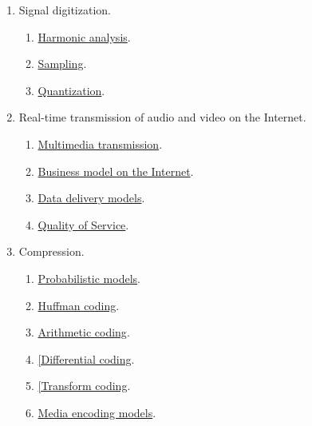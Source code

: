\begin{enumerate}
\item Signal digitization.
  \begin{enumerate}               
  \item \href{https://vicente-gonzalez-ruiz.github.io/harmonic_analysis/}{Harmonic analysis}.
  \item \href{https://vicente-gonzalez-ruiz.github.io/sampling/}{Sampling}.
  \item \href{https://vicente-gonzalez-ruiz.github.io/quantization/}{Quantization}.
  \end{enumerate}
  
\item Real-time transmission of audio and video on the Internet.
  \begin{enumerate}
  \item \href{(https://cdn.rawgit.com/vicente-gonzalez-ruiz/multimedia_transmission/master/index.html}{Multimedia transmission}.
  \item \href{https://cdn.rawgit.com/vicente-gonzalez-ruiz/Intenet_business_model/master/index.html}{Business model on the Internet}.
  \item \href{https://cdn.rawgit.com/vicente-gonzalez-ruiz/data_delivery_models/master/index.html}{Data delivery models}.
  \item \href{https://cdn.rawgit.com/vicente-gonzalez-ruiz/quality_of_service/master/index.html}{Quality of Service}.
  \end{enumerate}
  
\item Compression.
  \begin{enumerate}
  \item \href{https://cdn.rawgit.com/vicente-gonzalez-ruiz/Probabilistic_Models/master/index.html}{Probabilistic models}.
  \item \href{https://rawgit.com/vicente-gonzalez-ruiz/Huffman_Coding/master/index.html}{Huffman coding}.
  \item \href{https://cdn.rawgit.com/vicente-gonzalez-ruiz/Arithmetic_Coding/master/index.html}{Arithmetic coding}.
  \item \href{https://cdn.rawgit.com/vicente-gonzalez-ruiz/differential_coding/master/index.html}{[Differential coding}.
  \item \href{https://cdn.rawgit.com/vicente-gonzalez-ruiz/transform_coding/master/index.html}{[Transform coding}.
  \item \href{https://cdn.rawgit.com/vicente-gonzalez-ruiz/media_encoding_models/master/index.html}{Media encoding models}.
  \end{enumerate}

\end{enumerate}

%

